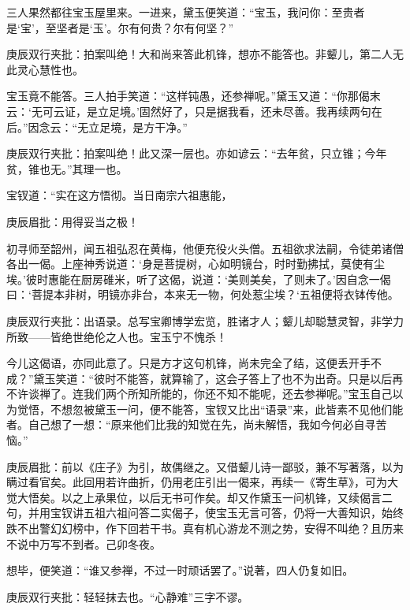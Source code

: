 \begin{parag}


    三人果然都往宝玉屋里来。一进来，黛玉便笑道：“宝玉，我问你：至贵者是‘宝’，至坚者是‘玉’。尔有何贵？尔有何坚？”\begin{note}庚辰双行夹批：拍案叫绝！大和尚来答此机锋，想亦不能答也。非颦儿，第二人无此灵心慧性也。\end{note}宝玉竟不能答。三人拍手笑道：“这样钝愚，还参禅呢。”黛玉又道：“你那偈末云：‘无可云证，是立足境。’固然好了，只是据我看，还未尽善。我再续两句在后。”因念云：“无立足境，是方干净。”\begin{note}庚辰双行夹批：拍案叫绝！此又深一层也。亦如谚云：“去年贫，只立锥；今年贫，锥也无。”其理一也。\end{note}宝钗道：“实在这方悟彻。当日南宗六祖惠能，\begin{note}庚辰眉批：用得妥当之极！\end{note}初寻师至韶州，闻五祖弘忍在黄梅，他便充役火头僧。五祖欲求法嗣，令徒弟诸僧各出一偈。上座神秀说道：‘身是菩提树，心如明镜台，时时勤拂拭，莫使有尘埃。’彼时惠能在厨房碓米，听了这偈，说道：‘美则美矣，了则未了。’因自念一偈曰：‘菩提本非树，明镜亦非台，本来无一物，何处惹尘埃？‘五祖便将衣钵传他。\begin{note}庚辰双行夹批：出语录。总写宝卿博学宏览，胜诸才人；颦儿却聪慧灵智，非学力所致——皆绝世绝伦之人也。宝玉宁不愧杀！\end{note}今儿这偈语，亦同此意了。只是方才这句机锋，尚未完全了结，这便丢开手不成？”黛玉笑道：“彼时不能答，就算输了，这会子答上了也不为出奇。只是以后再不许谈禅了。连我们两个所知所能的，你还不知不能呢，还去参禅呢。”宝玉自己以为觉悟，不想忽被黛玉一问，便不能答，宝钗又比出“语录”来，此皆素不见他们能者。自己想了一想：“原来他们比我的知觉在先，尚未解悟，我如今何必自寻苦恼。”\begin{note}庚辰眉批：前以《庄子》为引，故偶继之。又借颦儿诗一鄙驳，兼不写著落，以为瞒过看官矣。此回用若许曲折，仍用老庄引出一偈来，再续一《寄生草》，可为大觉大悟矣。以之上承果位，以后无书可作矣。却又作黛玉一问机锋，又续偈言二句，并用宝钗讲五祖六祖问答二实偈子，使宝玉无言可答，仍将一大善知识，始终跌不出警幻幻榜中，作下回若干书。真有机心游龙不测之势，安得不叫绝？且历来不说中万写不到者。己卯冬夜。\end{note}想毕，便笑道：“谁又参禅，不过一时顽话罢了。”说著，四人仍复如旧。\begin{note}庚辰双行夹批：轻轻抹去也。“心静难”三字不谬。\end{note}
\end{parag}


